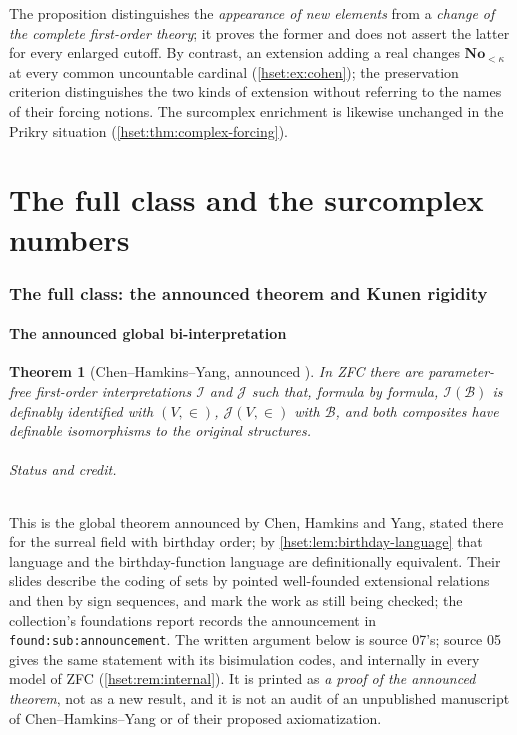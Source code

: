 \documentclass[11pt,letterpaper]{article}
\newtheorem{theorem}{Theorem}[section]
\theoremstyle{definition}
\theoremstyle{remark}
\newcommand{\No}{\mathbf{No}}
\newcommand{\B}{\mathcal B}
\newcommand{\I}{\mathcal I}
\newcommand{\J}{\mathcal J}
\newcommand{\lbl}[1]{\nolinkurl{#1}}
\begin{document}
The proposition distinguishes the \emph{appearance of new elements} from a
\emph{change of the complete first-order theory}; it proves the former and does
not assert the latter for every enlarged cutoff. By contrast, an extension
adding a real changes $\No_{<\kappa}$ at every common uncountable cardinal
(\cref{hset:ex:cohen}); the preservation criterion distinguishes the two kinds
of extension without referring to the names of their forcing notions. The
surcomplex enrichment is likewise unchanged in the Prikry situation
(\cref{hset:thm:complex-forcing}).

\part{The full class and the surcomplex numbers}\label{hset:part:class}

\section{The full class: the announced theorem and Kunen rigidity}
\label{hset:sec:fullclass}

\subsection{The announced global bi-interpretation}

\begin{theorem}[Chen--Hamkins--Yang, announced \cite{CHYKobe,CHYNotreDame,CHYCUNY}]
\label{hset:thm:chy}
In ZFC there are parameter-free first-order interpretations $\I$ and $\J$ such
that, formula by formula, $\I(\B)$ is definably identified with $(V,\in)$,
$\J(V,\in)$ with $\B$, and both composites have definable isomorphisms to the
original structures.
\end{theorem}

\paragraph{Status and credit.} This is the global theorem announced by Chen,
Hamkins and Yang, stated there for the surreal field with birthday order; by
\cref{hset:lem:birthday-language} that language and the birthday-function
language are definitionally equivalent. Their slides describe the coding of sets
by pointed well-founded extensional relations and then by sign sequences, and
mark the work as still being checked; the collection's foundations report
records the announcement in \lbl{found:sub:announcement}. The written argument
below is source 07's; source 05 gives the same statement with its bisimulation
codes, and internally in every model of ZFC (\cref{hset:rem:internal}). It is
printed as \emph{a proof of the announced theorem}, not as a new result, and it
is not an audit of an unpublished manuscript of Chen--Hamkins--Yang or of their
proposed axiomatization.
\end{document}
